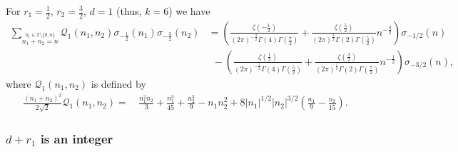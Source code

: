 \documentclass[]{article}
\begin{document}
For $r_1=\frac{1}{2}$, $r_2=\frac{3}{2}$, $d=1$ (thus,   $k=6$) we have 
    \begin{align}
\sum_{ \stackrel{n_1 \in \mathbb{Z} \setminus \{ 0,n \}}{n_1+n_2=n}  }   \mathcal{Q}_1(n_1,n_2) \sigma_{-\frac{1}{2}}(n_1) \sigma_{-\frac{3}{2}}(n_2)  
& = \left( \frac{ \zeta(-\frac{1}{2}) }{ (2 \pi )^{-\frac{3}{2}}\Gamma (4) \Gamma (\frac{7}{2})  } +   \frac{\zeta(\frac{5}{2})}{(2 \pi)^{\frac{3}{2}}\Gamma(2) \Gamma(\frac{5}{2})} n^{-\frac{3}{2} }\right)\sigma_{-1/2}(n) \nonumber\\ 
& \  \  - 
\left( \frac{ \zeta(\frac{1}{2}) }{ (2 \pi )^{-\frac{1}{2}}\Gamma (4) \Gamma (\frac{5}{2})  } +   \frac{\zeta(\frac{3}{2})}{(2 \pi)^{\frac{1}{2}}\Gamma(2) \Gamma(\frac{7}{2})} n^{-\frac{1}{2}}\right)\sigma_{-3/2}(n),
\end{align}
 where $\mathcal{Q}_1(n_1,n_2)$ is defined by 
\begin{equation}
    \begin{split}
 \frac{(n_1+n_2)^3}{2 \sqrt{2}} \mathcal{Q}_1(n_1,n_2)=&\,  \frac{ n_1^2 n_2}{3 }+\frac{ n_1^3}{45 }+\frac{ n_2^3}{9 }-  n_1 n_2^2 + 8|n_1|^{1/2} |n_2|^{3/2} \left(\frac{n_1}{9}- \frac{n_2}{15} \right).
    \end{split}
\end{equation}


\subsubsection{$d + r_1$ is an integer}\label{sec:d+r1integer_section}
     
\end{document}
